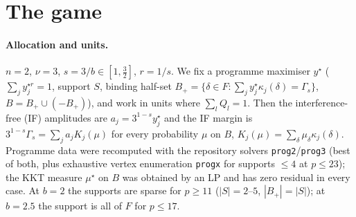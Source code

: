 \documentclass[11pt]{article}
\theoremstyle{definition}
\begin{document}
\begin{abstract}
at $|\beta_{l,T}|\approx0.5$--$0.8\,a_l$.  Dedicated compensators (with sibling accounting) never help.  Allocation moves \emph{do} help the network at first
order (the prover's best $\mu$ is not $\mu^\star$; forcing $\mu=\mu^\star$ loses, down to $0.655$), but the coverage gap they open bounds the effect: the best
moves found (local search on the tightest features) lower $\sigma$ by $\le27\%$ (Riesz, separate), $5$--$7\%$ (joint), $<1\%$ (quadratic test), and never below $1$ in the joint or quadratic game in the cases searched.
(4) The remaining gap for (O2) at $n=2$ is precisely: a rigorous form of the sharp bonus function $G^*$ (a $3$-variable
inequality on atom systems; only its linear envelope, Theorem A, is proved), and a $p$-uniform lower bound for the protection
curves $\Pi_T$, which are explicit SOCP values attached to the support and binding set of each programme vertex.
\end{abstract}

\tableofcontents

\section{The game}\label{sec:game}
\paragraph{Allocation and units.}  $n=2$, $\nu=3$, $s=3/b\in[1,\frac32]$, $r=1/s$.  We fix a programme maximiser $y^\star$
($\sum_jy_j^{\star r}=1$, support $S$, binding half-set $B_+=\{\delta\in F:\sum_jy^\star_j\kappa_j(\delta)=\Gamma_s\}$, $B=B_+\cup(-B_+)$),
and work in units where $\sum_lQ_l=1$.  Then the interference-free (IF) amplitudes are $a_j=3^{1-s}y_j^\star$ and the IF margin is
$3^{1-s}\Gamma_s=\sum_ja_jK_j(\mu)$ for every probability $\mu$ on $B$, $K_j(\mu)=\sum_\delta\mu_\delta\kappa_j(\delta)$.
Programme data were recomputed with the repository solvers \texttt{prog2}/\texttt{prog3} (best of both, plus exhaustive vertex enumeration
\texttt{progx} for supports $\le4$ at $p\le23$); the KKT measure $\mu^\star$ on $B$ was obtained by an LP and has zero residual in every case.
At $b=2$ the supports are sparse for $p\ge11$ ($|S|=2$--$5$, $|B_+|=|S|$); at $b=2.5$ the support is all of $F$ for $p\le17$.
\end{document}

